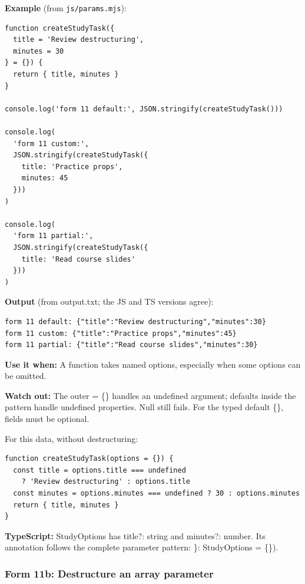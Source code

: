 \documentclass[10pt,a4paper]{article}
\begin{document}
\textbf{Example} (from \texttt{js/\allowbreak{}params.\allowbreak{}mjs}):

\begin{lstlisting}[language=GuideJS]
function createStudyTask({
  title = 'Review destructuring',
  minutes = 30
} = {}) {
  return { title, minutes }
}

console.log('form 11 default:', JSON.stringify(createStudyTask()))

console.log(
  'form 11 custom:',
  JSON.stringify(createStudyTask({
    title: 'Practice props',
    minutes: 45
  }))
)

console.log(
  'form 11 partial:',
  JSON.stringify(createStudyTask({
    title: 'Read course slides'
  }))
)
\end{lstlisting}


\textbf{Output} (from output.txt; the JS and TS versions agree):

\begin{lstlisting}[language={}]
form 11 default: {"title":"Review destructuring","minutes":30}
form 11 custom: {"title":"Practice props","minutes":45}
form 11 partial: {"title":"Read course slides","minutes":30}
\end{lstlisting}

\textbf{Use it when:} A function takes named options, especially when some options can be omitted.

\textbf{Watch out:} The outer = \{\} handles an undefined argument; defaults inside the pattern handle undefined properties. Null still fails. For the typed default \{\}, fields must be optional.


For this data, without destructuring:

\begin{lstlisting}[language=GuideJS]
function createStudyTask(options = {}) {
  const title = options.title === undefined
    ? 'Review destructuring' : options.title
  const minutes = options.minutes === undefined ? 30 : options.minutes
  return { title, minutes }
}
\end{lstlisting}

\textbf{TypeScript:} StudyOptions has title?: string and minutes?: number. Its annotation follows the complete parameter pattern: \}: StudyOptions = \{\}).

\subsubsection{Form 11b: Destructure an array parameter}
\end{document}
